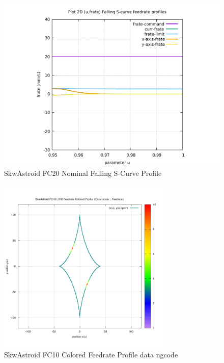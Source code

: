 \begin{figure}
	\caption     {SkwAstroid FC20 Nominal Falling S-Curve Profile}
	\label{16-img-SkwAstroid-FC20-Nominal-Falling-S-Curve-Profile.pdf}
	\includegraphics[width=1.00\textwidth]{Chap4/appendix/app-SkwAstroid/plots/16-img-SkwAstroid-FC20-Nominal-Falling-S-Curve-Profile.pdf}
\end{figure}

\clearpage
\pagebreak

\begin{figure}
	\caption     {SkwAstroid FC10 Colored Feedrate Profile data ngcode}
	\label{17-img-SkwAstroid-FC10-Colored-Feedrate-Profile-data_ngcode.png}
	\includegraphics[width=0.75\textwidth]{Chap4/appendix/app-SkwAstroid/plots/17-img-SkwAstroid-FC10-Colored-Feedrate-Profile-data_ngcode.png}
\end{figure}


